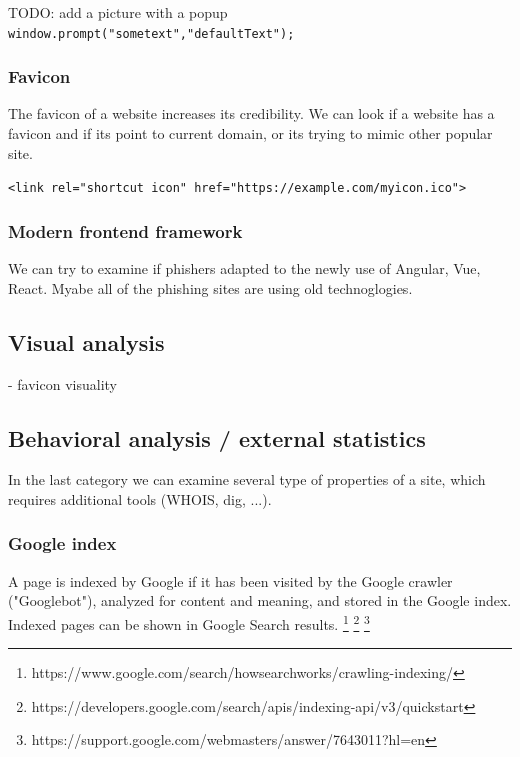 \documentclass[
  digital, %
  oneside, %
  table,   %
  nolof,     %
  nolot,     %
]{fithesis3}
\newcounter{feature}
\newenvironment{feature}[1]{\stepcounter{feature}%
    \tcolorbox[beamer,%
    noparskip,breakable,
    colback=LightBlue,colframe=DarkBlue,%
    colbacklower=DarkBlue!75!LightBlue,%
    title=Feature~\thefeature: #1]}%
    {\endtcolorbox}
\begin{document}
\begin{feature}{PopUp window}
TODO: add a picture with a popup
\texttt{window.prompt("sometext","defaultText");}
\end{feature}


\subsubsection{Favicon}

The favicon of a website increases its credibility. We can look if a website has a favicon and if its point to current domain, or its trying to mimic other popular site.

\begin{feature}{Favicon}
\texttt{<link rel="shortcut icon" href="https://example.com/myicon.ico">}
\end{feature}

\subsubsection{Modern frontend framework}

We can try to examine if phishers adapted to the newly use of Angular, Vue, React. Myabe all of the phishing sites are using old technoglogies.




\subsection{Visual analysis}
\label{section:visual-analysis}
\cite{favicon}
- favicon visuality



\subsection{Behavioral analysis / external statistics}
\label{section:behavioral-analysis}

In the last category we can examine several type of properties of a site, which requires additional tools (WHOIS, dig, ...).

\subsubsection{Google index}

A page is indexed by Google if it has been visited by the Google crawler ("Googlebot"), analyzed for content and meaning, and stored in the Google index. Indexed pages can be shown in Google Search results. 
\footnote{https://www.google.com/search/howsearchworks/crawling-indexing/}
\footnote{https://developers.google.com/search/apis/indexing-api/v3/quickstart}
\footnote{https://support.google.com/webmasters/answer/7643011?hl=en}
\end{document}
